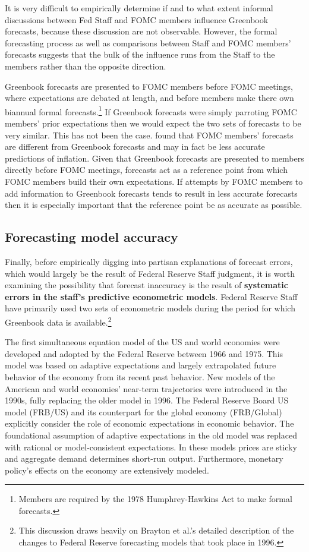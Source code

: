 \documentclass[a4paper]{article}
\begin{document}
It is very difficult to empirically determine if and to what extent informal discussions between Fed Staff and FOMC members influence Greenbook forecasts, because these discussion are not observable. However, the formal forecasting process as well as comparisons between Staff and FOMC members' forecasts suggests that the bulk of the influence runs from the Staff to the members rather than the opposite direction.

Greenbook forecasts are presented to FOMC members before FOMC meetings, where expectations are debated at length, and before members make there own biannual formal forecasts.\footnote{Members are required by the 1978 Humphrey-Hawkins Act to make formal forecasts.} If Greenbook forecasts were simply parroting FOMC members' prior expectations then we would expect the two sets of forecasts to be very similar. This has not been the case. \cite{RomerRomer2008} found that FOMC members' forecasts are different from Greenbook forecasts and may in fact be less accurate predictions of inflation. Given that Greenbook forecasts are presented to members directly before FOMC meetings, forecasts act as a reference point from which FOMC members build their own expectations. If attempts by FOMC members to add information to Greenbook forecasts tends to result in less accurate forecasts then it is especially important that the reference point be as accurate as possible.  

\subsection{Forecasting model accuracy}

Finally, before empirically digging into partisan explanations of forecast errors, which would largely be the result of Federal Reserve Staff judgment, it is worth examining the possibility that forecast inaccuracy is the result of \textbf{systematic errors in the staff's predictive econometric models}. Federal Reserve Staff have primarily used two sets of econometric models during the period for which Greenbook data is available.\footnote{This discussion draws heavily on Brayton et al.'s \citeyear{Brayton1997} detailed description of the changes to Federal Reserve forecasting models that took place in 1996.} 

The first simultaneous equation model of the US and world economies were developed and adopted by the Federal Reserve between 1966 and 1975. This model was based on adaptive expectations and largely extrapolated future behavior of the economy from its recent past behavior. New models of the American and world economies' near-term trajectories were introduced in the 1990s, fully replacing the older model in 1996. The Federal Reserve Board US model (FRB/US) and its counterpart for the global economy (FRB/Global) explicitly consider the role of economic expectations in economic behavior. The foundational assumption of adaptive expectations in the old model was replaced with rational or model-consistent expectations. In these models prices are sticky and aggregate demand determines short-run output. Furthermore, monetary policy's effects on the economy are extensively modeled. 
\end{document}
